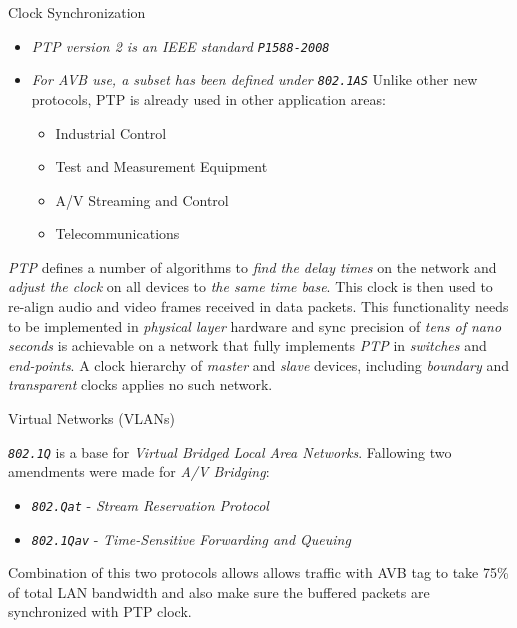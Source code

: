 \documentclass{beamer}
\begin{document}
\begin{frame}[allowframebreaks]{ Clock Synchronization }

\begin{itemize}
	\item \emph{ PTP version 2 is an IEEE standard \texttt{P1588-2008} }
	\item \emph{ For AVB use, a subset has been defined under \texttt{802.1AS} }
Unlike other new protocols, \newline PTP is already used in other application areas:

\begin{itemize}
	\item Industrial Control
	\item Test and Measurement Equipment
	\item A/V Streaming and Control
	\item Telecommunications
\end{itemize}

\end{itemize}

\break

{ \emph{PTP} defines a number of algorithms to \emph{find the delay times} on the network
and \emph{adjust the clock} on all devices to \emph{the same time base}. This clock is then
used to re-align audio and video frames received in data packets.
This functionality needs to be implemented in \emph{physical layer} hardware and
sync precision of \emph{tens of nano seconds} is achievable on a network that fully
implements \emph{PTP} in \emph{switches} and \emph{end-points}. \newline
A clock hierarchy of \emph{master} and \emph{slave} devices,
including \emph{boundary} and \emph{transparent} clocks applies no such network. }

\end{frame}


\begin{frame}{ Virtual Networks (VLANs)}

\emph{\texttt{802.1Q}} is a base for \emph{Virtual Bridged Local Area Networks}.
Fallowing two amendments were made for \emph{A/V Bridging}:
\begin{itemize}
	\item \emph{\texttt{802.Qat}} - \emph{Stream Reservation Protocol}
	\item \emph{\texttt{802.1Qav}} - \emph{Time-Sensitive Forwarding and Queuing}
\end{itemize}

{ Combination of this two protocols allows allows traffic with AVB tag to take 75\% of total
LAN bandwidth and also make sure the buffered packets are synchronized with PTP clock. }

\end{frame}
\end{document}

